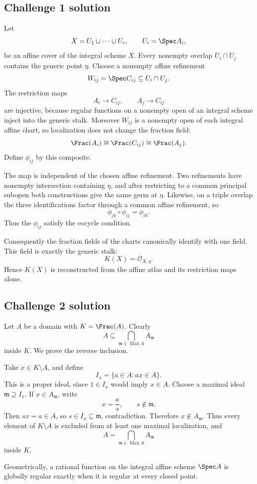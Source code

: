 
\subsection*{Challenge 1 solution}
\begin{solution}
Let
\[
X=U_1\cup\cdots\cup U_r,\qquad U_i=\Spec A_i,
\]
be an affine cover of the integral scheme \(X\). Every nonempty overlap \(U_i\cap U_j\) contains the generic
point \(\eta\). Choose a nonempty affine refinement
\[
W_{ij}=\Spec C_{ij}\subseteq U_i\cap U_j.
\]
The restriction maps
\[
A_i\to C_{ij},\qquad A_j\to C_{ij}
\]
are injective, because regular functions on a nonempty open of an integral scheme inject into the generic stalk.
Moreover \(W_{ij}\) is a nonempty open of each integral affine chart, so localization does not change the fraction
field:
\[
\Frac(A_i)\cong\Frac(C_{ij})\cong\Frac(A_j).
\]
Define \(\phi_{ij}\) by this composite.

The map is independent of the chosen affine refinement. Two refinements have nonempty intersection containing
\(\eta\), and after restricting to a common principal subopen both constructions give the same germ at \(\eta\).
Likewise, on a triple overlap the three identifications factor through a common affine refinement, so
\[
\phi_{jk}\circ\phi_{ij}=\phi_{ik}.
\]
Thus the \(\phi_{ij}\) satisfy the cocycle condition.

Consequently the fraction fields of the charts canonically identify with one field. This field is exactly the
generic stalk:
\[
K(X)=\mathcal O_{X,\eta}.
\]
Hence \(K(X)\) is reconstructed from the affine atlas and its restriction maps alone.
\end{solution}

\subsection*{Challenge 2 solution}
\begin{solution}
Let \(A\) be a domain with \(K=\Frac(A)\). Clearly
\[
A\subseteq\bigcap_{\mathfrak m\in\operatorname{Max}A}A_{\mathfrak m}
\]
inside \(K\). We prove the reverse inclusion.

Take \(x\in K\setminus A\), and define
\[
I_x=\{a\in A:ax\in A\}.
\]
This is a proper ideal, since \(1\in I_x\) would imply \(x\in A\). Choose a maximal ideal
\(\mathfrak m\supseteq I_x\). If \(x\in A_{\mathfrak m}\), write
\[
x=\frac as,\qquad s\notin\mathfrak m.
\]
Then \(sx=a\in A\), so \(s\in I_x\subseteq\mathfrak m\), contradiction. Therefore
\(x\notin A_{\mathfrak m}\). Thus every element of \(K\setminus A\) is excluded from at least one maximal
localization, and
\[
\boxed{
A=\bigcap_{\mathfrak m\in\operatorname{Max}A}A_{\mathfrak m}
}
\]
inside \(K\).

Geometrically, a rational function on the integral affine scheme \(\Spec A\) is globally regular exactly when it
is regular at every closed point.
\end{solution}

